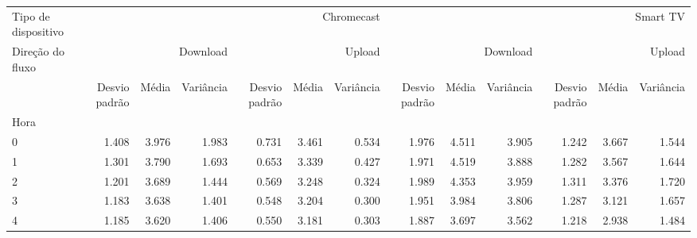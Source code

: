 \begin{tabular}{lrrrrrrrrrrrr}
	\toprule
	Tipo de dispositivo & \multicolumn{6}{r}{Chromecast} & \multicolumn{6}{r}{Smart TV}                                                                                                                                                         \\
	Direção do fluxo    & \multicolumn{3}{r}{Download}   & \multicolumn{3}{r}{Upload}   & \multicolumn{3}{r}{Download} & \multicolumn{3}{r}{Upload}                                                                                             \\
	                    & Desvio padrão                  & Média                        & Variância                    & Desvio padrão              & Média & Variância & Desvio padrão & Média & Variância & Desvio padrão & Média & Variância \\
	Hora                &                                &                              &                              &                            &       &           &               &       &           &               &       &           \\
	\midrule
	0                   & 1.408                          & 3.976                        & 1.983                        & 0.731                      & 3.461 & 0.534     & 1.976         & 4.511 & 3.905     & 1.242         & 3.667 & 1.544     \\
	1                   & 1.301                          & 3.790                        & 1.693                        & 0.653                      & 3.339 & 0.427     & 1.971         & 4.519 & 3.888     & 1.282         & 3.567 & 1.644     \\
	2                   & 1.201                          & 3.689                        & 1.444                        & 0.569                      & 3.248 & 0.324     & 1.989         & 4.353 & 3.959     & 1.311         & 3.376 & 1.720     \\
	3                   & 1.183                          & 3.638                        & 1.401                        & 0.548                      & 3.204 & 0.300     & 1.951         & 3.984 & 3.806     & 1.287         & 3.121 & 1.657     \\
	4                   & 1.185                          & 3.620                        & 1.406                        & 0.550                      & 3.181 & 0.303     & 1.887         & 3.697 & 3.562     & 1.218         & 2.938 & 1.484     \\

\end{tabular}
